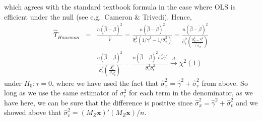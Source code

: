\documentclass[12pt]{article}
\theoremstyle{definition}
\begin{document}
which agrees with the standard textbook formula in the case where OLS is efficient under the null (see e.g.\ Cameron \& Trivedi). Hence,
  \begin{eqnarray*}
    \widehat{T}_{Hausman} &=& \frac{n(\widehat{\beta} - \widetilde{\beta})^2}{\widehat{V}} = \frac{n(\widehat{\beta} - \widetilde{\beta})^2}{\widehat{\sigma}_\epsilon^2\left(1/\widehat{\gamma}^2 - 1/\widehat{\sigma}_x^2\right)}= \frac{n(\widehat{\beta} - \widetilde{\beta})^2}{\widehat{\sigma}_\epsilon^2\left(\displaystyle \frac{\widehat{\sigma}_x^2 - \widehat{\gamma}^2}{\widehat{\gamma}^2 \widehat{\sigma}_x^2}\right)}\\
     &=& \frac{n(\widehat{\beta} - \widetilde{\beta})^2}{\widehat{\sigma}_\epsilon^2\left(\displaystyle \frac{\widehat{\sigma}_v^2}{\widehat{\gamma}^2 \widehat{\sigma}_x^2}\right)}
     =\frac{n(\widehat{\beta} - \widetilde{\beta})^2 \widehat{\sigma}_x^2 \widehat{\gamma}^2}{\widehat{\sigma}_v^2 \widehat{\sigma}_\epsilon^2}
     \overset{d}{\rightarrow} \chi^2(1)
  \end{eqnarray*}
under $H_0\colon \tau = 0$, where we have used the fact that $\widehat{\sigma}_x^2 = \widehat{\gamma}^2 + \widehat{\sigma}_v^2$ from above. So long as we use the same estimator of $\sigma_\epsilon^2$ for each term in the denominator, as we have here, we can be sure that the difference is positive since $\widehat{\sigma}_x^2 = \widehat{\gamma}^2 + \widehat{\sigma}_v^2$ and we showed above that $\widehat{\sigma}_v^2 = (M_Z \mathbf{x})'(M_Z \mathbf{x})/n$.
\end{document}
